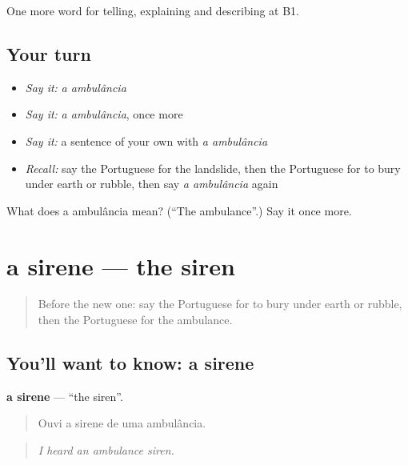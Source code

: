 \begin{grammarlens}[title={What you've built}]
One more word for telling, explaining and describing at B1.
\end{grammarlens}

\subsection*{Your turn}
\begin{itemize}
\raggedright
  \item \emph{Say it:} \emph{a ambulância}
  \item \emph{Say it:} \emph{a ambulância}, once more
  \item \emph{Say it:} a sentence of your own with \emph{a ambulância}
  \item \emph{Recall:} say the Portuguese for the landslide, then the Portuguese for to bury under earth or rubble, then say \emph{a ambulância} again
\end{itemize}

\begin{tcolorbox}[breakable,colback=teal!4,colframe=teal!35!black,title={Before you move on}]
What does a ambulância mean? (\textquotedblleft{}The ambulance\textquotedblright{}.) Say it once more.
\end{tcolorbox}
\section[a sirene]{a sirene — the siren}

\label{lesson:PT-C305-sirene}



\begin{quote}
Before the new one: say the Portuguese for to bury under earth or rubble, then the Portuguese for the ambulance.
\end{quote}

\subsection*{You'll want to know: a sirene}
\textbf{a sirene} — \textquotedblleft{}the siren\textquotedblright{}.

\begin{quote}
Ouvi a sirene de uma ambulância.
\end{quote}

\begin{quote}
\emph{I heard an ambulance siren.}
\end{quote}

